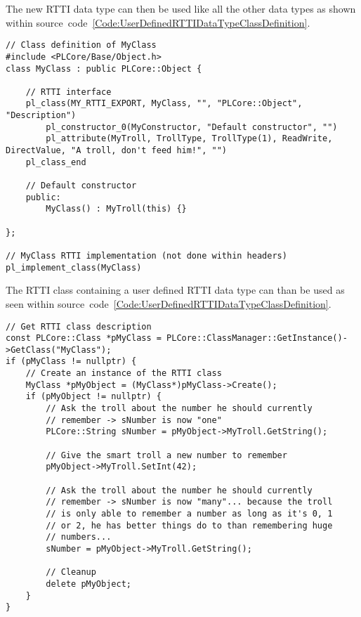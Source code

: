 The new \ac{RTTI} data type can then be used like all the other data types as shown within source~code~\ref{Code:UserDefinedRTTIDataTypeClassDefinition}.
\begin{lstlisting}[label=Code:UserDefinedRTTIDataTypeClassDefinition,caption={\ac{RTTI} class using a user defined \ac{RTTI} data type}]
// Class definition of MyClass
#include <PLCore/Base/Object.h>
class MyClass : public PLCore::Object {

	// RTTI interface
	pl_class(MY_RTTI_EXPORT, MyClass, "", "PLCore::Object", "Description")
		pl_constructor_0(MyConstructor, "Default constructor", "")
		pl_attribute(MyTroll, TrollType, TrollType(1), ReadWrite, DirectValue, "A troll, don't feed him!", "")
	pl_class_end

	// Default constructor
	public:
		MyClass() : MyTroll(this) {}

};

// MyClass RTTI implementation (not done within headers)
pl_implement_class(MyClass)
\end{lstlisting}
The \ac{RTTI} class containing a user defined \ac{RTTI} data type can than be used as seen within source~code~\ref{Code:UserDefinedRTTIDataTypeClassDefinition}.
\begin{lstlisting}[label=Code:UserDefinedRTTIDataTypeClassUsage,caption={Using a \ac{RTTI} class containing a user defined \ac{RTTI} data type}]
// Get RTTI class description
const PLCore::Class *pMyClass = PLCore::ClassManager::GetInstance()->GetClass("MyClass");
if (pMyClass != nullptr) {
	// Create an instance of the RTTI class
	MyClass *pMyObject = (MyClass*)pMyClass->Create();
	if (pMyObject != nullptr) {
		// Ask the troll about the number he should currently
		// remember -> sNumber is now "one"
		PLCore::String sNumber = pMyObject->MyTroll.GetString();

		// Give the smart troll a new number to remember
		pMyObject->MyTroll.SetInt(42);

		// Ask the troll about the number he should currently
		// remember -> sNumber is now "many"... because the troll
		// is only able to remember a number as long as it's 0, 1
		// or 2, he has better things do to than remembering huge
		// numbers...
		sNumber = pMyObject->MyTroll.GetString();

		// Cleanup
		delete pMyObject;
	}
}
\end{lstlisting}


